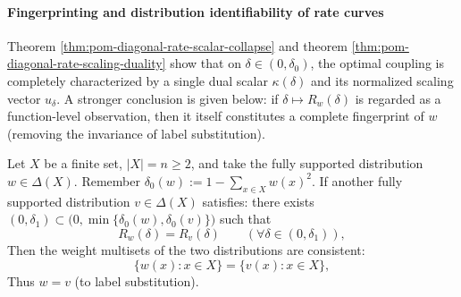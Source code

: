 \paragraph{Fingerprinting and distribution identifiability of rate curves}
Theorem \ref{thm:pom-diagonal-rate-scalar-collapse} and theorem \ref{thm:pom-diagonal-rate-scaling-duality} show that on \(\delta\in(0,\delta_0)\), the optimal coupling is completely characterized by a single dual scalar \(\kappa(\delta)\) and its normalized scaling vector \(u_\delta\).
A stronger conclusion is given below: if \(\delta\mapsto R_w(\delta)\) is regarded as a function-level observation, then it itself constitutes a complete fingerprint of \(w\) (removing the invariance of label substitution).

\begin{theorem}\label{thm:pom-diagonal-rate-rate-curve-identifiability}
Let \(X\) be a finite set, \(|X|=n\ge 2\), and take the fully supported distribution \(w\in\Delta(X)\).
Remember \(\delta_0(w):=1-\sum_{x\in X}w(x)^2\).
If another fully supported distribution \(v\in\Delta(X)\) satisfies: there exists \((0,\delta_1)\subset\bigl(0,\min\{\delta_0(w),\delta_0(v)\}\bigr)\) such that
\[
R_w(\delta)=R_v(\delta)\qquad(\forall \delta\in(0,\delta_1)),
\]
Then the weight multisets of the two distributions are consistent:
\[
\{w(x):x\in X\}=\{v(x):x\in X\},
\]
Thus \(w=v\) (to label substitution).
\end{theorem}
